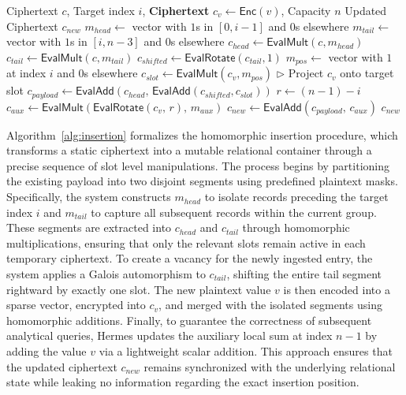\documentclass[sigconf,nonacm]{acmart}
\begin{document}
\begin{algorithm}[t]
\caption{Homomorphic Insertion}
\label{alg:insertion}
\begin{algorithmic}[1]
\Require Ciphertext $c$, Target index $i$, \textbf{Ciphertext} $c_v \leftarrow \mathsf{Enc}(v)$, Capacity $n$
\Ensure Updated Ciphertext $c_{new}$
\State $m_{head} \leftarrow$ vector with $1$s in $[0, i-1]$ and $0$s elsewhere
\State $m_{tail} \leftarrow$ vector with $1$s in $[i, n-3]$ and $0$s elsewhere
\State $c_{head} \leftarrow \mathsf{EvalMult}(c, m_{head})$
\State $c_{tail} \leftarrow \mathsf{EvalMult}(c, m_{tail})$
\State $c_{shifted} \leftarrow \mathsf{EvalRotate}(c_{tail}, 1)$
\State $m_{pos} \leftarrow$ vector with $1$ at index $i$ and $0$s elsewhere
\State $c_{slot} \leftarrow \mathsf{EvalMult}(c_v, m_{pos})$
  \hfill $\triangleright$ Project $c_v$ onto target slot
\State $c_{payload} \leftarrow \mathsf{EvalAdd}(c_{head},\, \mathsf{EvalAdd}(c_{shifted}, c_{slot}))$
\State $r \leftarrow (n - 1) - i$
\State $c_{aux} \leftarrow \mathsf{EvalMult}(\mathsf{EvalRotate}(c_v,\, r),\, m_{aux})$
\State $c_{new} \leftarrow \mathsf{EvalAdd}(c_{payload},\, c_{aux})$
\State \Return $c_{new}$
\end{algorithmic}
\end{algorithm}

Algorithm~\ref{alg:insertion} formalizes the homomorphic insertion procedure, which transforms a static ciphertext into a mutable relational container through a precise sequence of slot level manipulations. The process begins by partitioning the existing payload into two disjoint segments using predefined plaintext masks. Specifically, the system constructs $m_{head}$ to isolate records preceding the target index $i$ and $m_{tail}$ to capture all subsequent records within the current group. These segments are extracted into $c_{head}$ and $c_{tail}$ through homomorphic multiplications, ensuring that only the relevant slots remain active in each temporary ciphertext. To create a vacancy for the newly ingested entry, the system applies a Galois automorphism to $c_{tail}$, shifting the entire tail segment rightward by exactly one slot. The new plaintext value $v$ is then encoded into a sparse vector, encrypted into $c_v$, and merged with the isolated segments using homomorphic additions. Finally, to guarantee the correctness of subsequent analytical queries, Hermes updates the auxiliary local sum at index $n-1$ by adding the value $v$ via a lightweight scalar addition. This approach ensures that the updated ciphertext $c_{new}$ remains synchronized with the underlying relational state while leaking no information regarding the exact insertion position.
\end{document}
